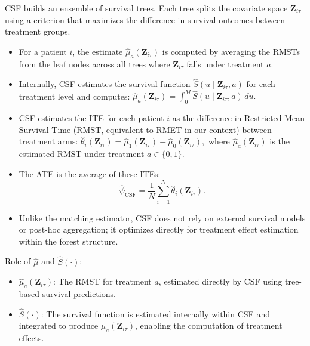 CSF builds an ensemble of survival trees.
Each tree splits the covariate space $ \mathbf{Z}_{i\tau} $ using a criterion that maximizes the difference in survival outcomes between treatment groups.
\begin{itemize}
\item For a patient $ i $, the estimate $ \widehat{\mu}_a(\mathbf{Z}_{i\tau}) $ is computed by averaging the RMSTs from the leaf nodes across all trees where $ \mathbf{Z}_{i\tau} $ falls under treatment $ a $.
\item Internally, CSF estimates the survival function $ \widehat{S}(u \mid \mathbf{Z}_{i\tau}, a) $ for each treatment level and computes:
  $ \widehat{\mu}_a(\mathbf{Z}_{i\tau}) = \int_{0}^{M} \widehat{S}(u \mid \mathbf{Z}_{i\tau}, a) \, du. $
\item CSF estimates the ITE for each patient $ i $ as the difference in Restricted Mean Survival Time (RMST, equivalent to RMET in our context) between treatment arms:
  $ \widehat{\theta}_{i}(\mathbf{Z}_{i\tau}) = \widehat{\mu}_1(\mathbf{Z}_{i\tau}) - \widehat{\mu}_0(\mathbf{Z}_{i\tau}), $
  where $ \widehat{\mu}_a(\mathbf{Z}_{i\tau}) $ is the estimated RMST under treatment $ a \in \{0, 1\} $.
\item The ATE is the average of these ITEs:
  \[ \widehat{\psi}_{\text{CSF}} = \frac{1}{N} \sum_{i=1}^{N} \widehat{\theta}_{i}(\mathbf{Z}_{i\tau}). \]
\item Unlike the matching estimator, CSF does not rely on external survival models or post-hoc aggregation; it optimizes directly for treatment effect estimation within the forest structure.
\end{itemize}

Role of $ \widehat{\mu} $ and $ \widehat{S}(\cdot) $:
\begin{itemize}
\item $ \widehat{\mu}_a(\mathbf{Z}_{i\tau}) $: The RMST for treatment $ a $, estimated directly by CSF using tree-based survival predictions.
\item $ \widehat{S}(\cdot) $: The survival function is estimated internally within CSF and integrated to produce $ \widehat{\mu}_a(\mathbf{Z}_{i\tau}) $, enabling the computation of treatment effects.
\end{itemize}



